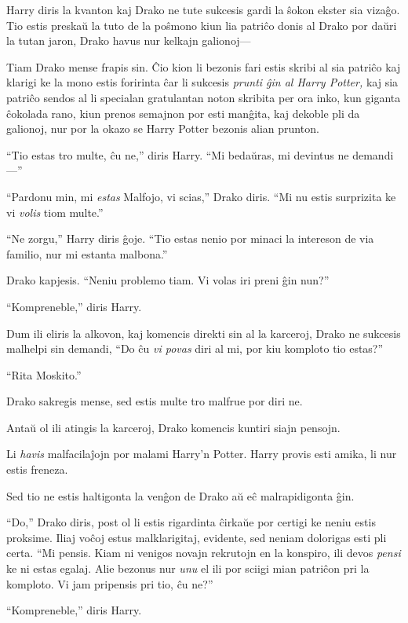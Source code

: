 Harry diris la kvanton kaj Drako ne tute sukcesis gardi la ŝokon
ekster sia vizaĝo. Tio estis preskaŭ la tuto de la poŝmono kiun lia
patriĉo donis al Drako por daŭri la tutan jaron, Drako havus nur
kelkajn galionoj—

Tiam Drako mense frapis sin. Ĉio kion li bezonis fari estis skribi al
sia patriĉo kaj klarigi ke la mono estis foririnta ĉar li sukcesis
\emph{prunti ĝin al Harry Potter,} kaj sia patriĉo sendos al li
specialan gratulantan noton skribita per ora inko, kun giganta ĉokolada
rano, kiun prenos semajnon por esti manĝita, kaj dekoble pli da
galionoj, nur por la okazo se Harry Potter bezonis alian prunton.

``Tio estas tro multe, ĉu ne,'' diris Harry. ``Mi bedaŭras, mi devintus ne demandi—'' 

``Pardonu min, mi \emph{estas} Malfojo, vi scias,'' Drako diris. ``Mi nu estis surprizita ke vi \emph{volis} tiom multe.''

``Ne zorgu,'' Harry diris ĝoje. ``Tio estas nenio por minaci la intereson de via familio, nur mi estanta malbona.''

Drako kapjesis. ``Neniu problemo tiam. Vi volas iri preni ĝin nun?''

``Kompreneble,'' diris Harry.

Dum ili eliris la alkovon, kaj komencis direkti sin al la karceroj,
Drako ne sukcesis malhelpi sin demandi, ``Do ĉu \emph{vi povas} diri
al mi, por kiu komploto tio estas?''

``Rita Moskito.''

Drako sakregis mense, sed estis multe tro malfrue por diri ne.

\later

Antaŭ ol ili atingis la karceroj, Drako komencis kuntiri siajn pensojn.

Li \emph{havis} malfacilaĵojn por malami Harry'n Potter. Harry provis
esti amika, li nur estis freneza.

Sed tio ne estis haltigonta la venĝon de Drako aŭ eĉ malrapidigonta ĝin.

``Do,'' Drako diris, post ol li estis rigardinta ĉirkaŭe por certigi
ke neniu estis proksime. Iliaj voĉoj estus malklarigitaj, evidente,
sed neniam dolorigas esti pli certa. ``Mi pensis. Kiam ni venigos
novajn rekrutojn en la konspiro, ili devos \emph{pensi} ke ni estas
egalaj. Alie bezonus nur \emph{unu} el ili por sciigi mian patriĉon
pri la komploto. Vi jam pripensis pri tio, ĉu ne?''

``Kompreneble,'' diris Harry.

